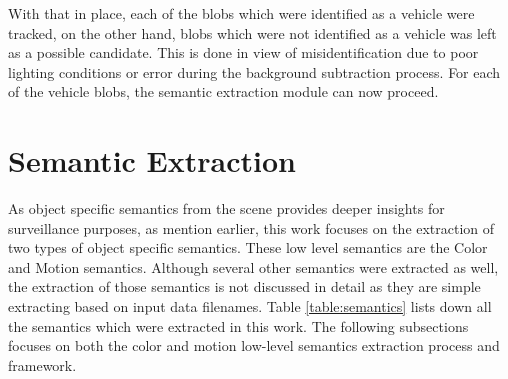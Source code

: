 With that in place, each of the blobs which were identified as a vehicle were tracked, on the other hand, blobs which were not identified as a vehicle was left as a possible candidate. This is done in view of misidentification due to poor lighting conditions or error during the background subtraction process. For each of the vehicle blobs, the semantic extraction module can now proceed.  





\section{Semantic Extraction} 
\label{section:semanticsExtraction}

As object specific semantics from the scene provides deeper insights for surveillance purposes, as mention earlier, this work focuses on the extraction of two types of object specific semantics. These low level semantics are the Color and Motion semantics. Although several other semantics were extracted as well, the extraction of those semantics is not discussed in detail as they are simple extracting based on input data filenames. Table \ref{table:semantics} lists down all the semantics which were extracted in this work. The following subsections focuses on both the color and motion low-level semantics extraction process and framework.  



